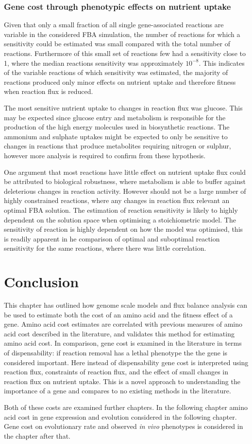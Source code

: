 \subsubsection{Gene cost through phenotypic effects on nutrient uptake}%

Given that only a small fraction of all single gene-associated reactions are variable in the considered FBA simulation, the number of reactions for which a sensitivity could be estimated was small compared with the total number of reactions. Furthermore of this small set of reactions few had a sensitivity close to 1, where the median reactions sensitivity was approximately $10^{-8}$. This indicates of the variable reactions of which sensitivity was estimated, the majority of reactions produced only minor effects on nutrient uptake and therefore fitness when reaction flux is reduced.

The most sensitive nutrient uptake to changes in reaction flux was glucose. This may be expected since glucose entry and metabolism is responsible for the production of the high energy molecules used in biosynthetic reactions. The ammonium and sulphate uptakes might be expected to only be sensitive to changes in reactions that produce metabolites requiring nitrogen or sulphur, however more analysis is required to confirm from these hypothesis.

One argument that most reactions have little effect on nutrient uptake flux could be attributed to biological robustness, where metabolism is able to buffer against deleterious changes in reaction activity. However should not be a large number of highly constrained reactions, where any changes in reaction flux relevant an optimal FBA solution. The estimation of reaction sensitivity is likely to highly dependent on the solution space when optimising a stoichiometric model. The sensitivity of reaction is highly dependent on how the model was optimised, this is readily apparent in he comparison of optimal and suboptimal reaction sensitivity for the same reactions, where there was little correlation.

\clearpage

\section{Conclusion}%

This chapter has outlined how genome scale models and flux balance analysis can be used to estimate both the cost of an amino acid and the fitness effect of a gene. Amino acid cost estimates are correlated with previous measures of amino acid cost described in the literature, and validates this method for estimating amino acid cost. In comparison, gene cost is examined in the literature in terms of dispensability: if reaction removal has a lethal phenotype the the gene is considered important. Here instead of dispensability gene cost is interpreted using reaction flux, constraints of reaction flux, and the effect of small changes in reaction flux on nutrient uptake. This is a novel approach to understanding the importance of a gene and compares to no existing methods in the literature.

Both of these costs are examined further chapters. In the following chapter amino acid cost in gene expression and evolution considered in the following chapter. Gene cost on evolutionary rate and observed \emph{in vivo} phenotypes is considered in the chapter after that.

